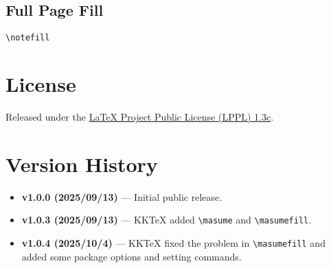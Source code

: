 \documentclass[a4paper,12pt]{article}
\begin{document}
\subsection{Full Page Fill}
\begin{verbatim}
\notefill
\end{verbatim}
\notefill\newpage

\section{License}

Released under the \href{https://www.latex-project.org/lppl/}{LaTeX Project Public License (LPPL) 1.3c}.

\section{Version History}

\begin{itemize}
    \item \textbf{v1.0.0 (2025/09/13)} --- Initial public release.
    \item \textbf{v1.0.3 (2025/09/13)} --- KKTeX added \texttt{\textbackslash masume} and \texttt{\textbackslash masumefill}.
    \item \textbf{v1.0.4 (2025/10/4)} --- KKTeX fixed the problem in \verb|\masumefill| and added some package options and setting commands.
\end{itemize}
\end{document}
